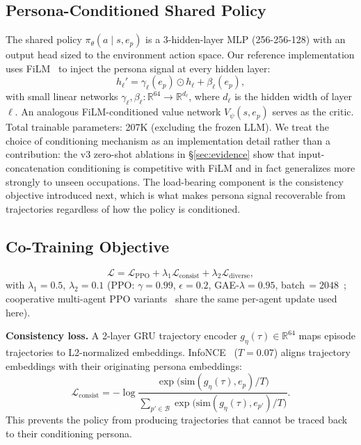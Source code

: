 \documentclass[conference]{IEEEtran}
\begin{document}
\subsection{Persona-Conditioned Shared Policy}

The shared policy $\pi_\theta(a \mid s, e_p)$ is a 3-hidden-layer MLP
(256-256-128) with an output head sized to the environment action space.
Our reference
implementation uses FiLM~\cite{perez2018film} to inject the persona signal at
every hidden layer:
\[
  h_\ell' = \gamma_\ell(e_p) \odot h_\ell + \beta_\ell(e_p),
\]
with small linear networks
$\gamma_\ell, \beta_\ell : \mathbb{R}^{64} \to \mathbb{R}^{d_\ell}$,
where $d_\ell$ is the hidden width of layer $\ell$.
An analogous FiLM-conditioned value network $V_\psi(s, e_p)$ serves as the
critic. Total trainable parameters: 207K (excluding the frozen LLM).
We treat the choice of conditioning mechanism as an implementation detail
rather than a contribution: the v3 zero-shot ablations in
\S\ref{sec:evidence} show that input-concatenation conditioning is competitive
with FiLM and in fact generalizes more strongly to unseen occupations. The
load-bearing component is the consistency objective introduced next, which is
what makes persona signal recoverable from trajectories regardless of how
the policy is conditioned.

\subsection{Co-Training Objective}

\begin{equation}
  \mathcal{L} = \mathcal{L}_{\text{PPO}} + \lambda_1 \mathcal{L}_{\text{consist}}
    + \lambda_2 \mathcal{L}_{\text{diverse}},
\end{equation}
with $\lambda_1\!=\!0.5$, $\lambda_2\!=\!0.1$ (PPO: $\gamma\!=\!0.99$,
$\epsilon\!=\!0.2$, GAE-$\lambda\!=\!0.95$, batch\,$=\!2048$~\cite{schulman2017ppo};
cooperative multi-agent PPO variants~\cite{yu2022mappo,dewitt2020ippo} share the
same per-agent update used here).

\textbf{Consistency loss.}
A 2-layer GRU trajectory encoder $g_\eta(\tau) \in \mathbb{R}^{64}$
maps episode trajectories to L2-normalized embeddings.
InfoNCE~\cite{oord2018cpc} ($T\!=\!0.07$) aligns trajectory embeddings with
their originating persona embeddings:
\begin{equation}
  \mathcal{L}_{\text{consist}} = -\log
  \frac{\exp\!\bigl(\text{sim}(g_\eta(\tau), e_p)/T\bigr)}
       {\sum_{p' \in \mathcal{B}} \exp\!\bigl(\text{sim}(g_\eta(\tau), e_{p'})/T\bigr)}.
\end{equation}
This prevents the policy from producing trajectories that cannot be traced back
to their conditioning persona.
\end{document}
